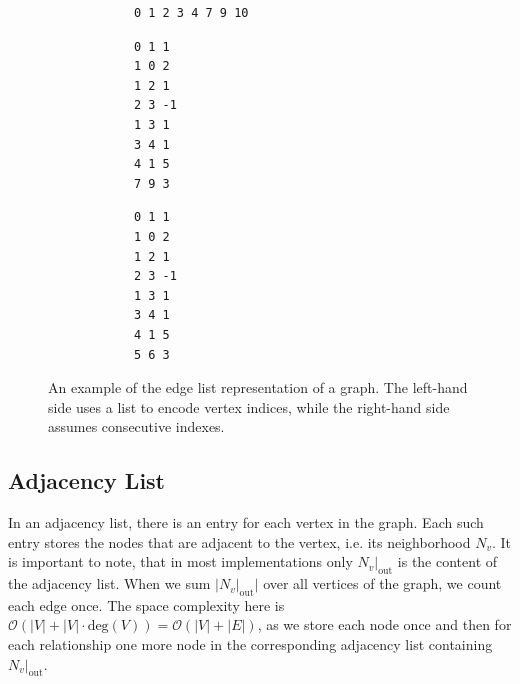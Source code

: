             \begin{figure}[htp]
            \begin{center}
            \begin{minipage}{0.5\textwidth}
            \begin{verbatim}
            0 1 2 3 4 7 9 10
            \end{verbatim}
            \begin{verbatim}
            0 1 1
            1 0 2
            1 2 1
            2 3 -1
            1 3 1
            3 4 1
            4 1 5
            7 9 3
            \end{verbatim}
            \end{minipage}%
            \hfill%
            \begin{minipage}{0.5\textwidth}
            \begin{verbatim}
            0 1 1
            1 0 2
            1 2 1
            2 3 -1
            1 3 1
            3 4 1
            4 1 5
            5 6 3
            \end{verbatim}
            \end{minipage}
            \end{center}
            \caption{%
                An example of the edge list representation of a graph.%
                The left-hand side uses a list to encode vertex indices, while the right-hand side assumes consecutive indexes.%
            }
            \label{edgelist}
            \end{figure}
        
        \subsection{Adjacency List}
        In an adjacency list, there is an entry for each vertex in the graph. 
        Each such entry stores the nodes that are adjacent to the vertex, i.e. its neighborhood $N_v$. 
        It is important to note, that in most implementations only $N_v |_\text{out}$ is the content of the adjacency list.
        When we sum $|N_v |_\text{out}|$ over all vertices of the graph, we count each edge once.
        The space complexity here is $\mathcal{O}(|V| + |V| \cdot \text{deg}(V)) = \mathcal{O}(|V| + |E|)$, as we store each node once and then for each relationship one more node in the corresponding adjacency list containing $N_v |_\text{out}$.

